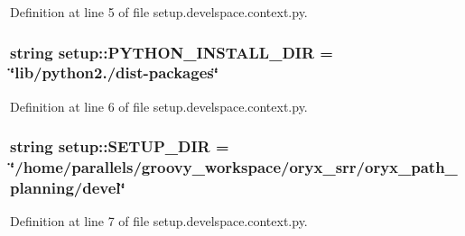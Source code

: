 \-Definition at line 5 of file setup.\-develspace.\-context.\-py.

\subsubsection[{\-P\-Y\-T\-H\-O\-N\-\_\-\-I\-N\-S\-T\-A\-L\-L\-\_\-\-D\-I\-R}]{\setlength{\rightskip}{0pt plus 5cm}string {\bf setup\-::\-P\-Y\-T\-H\-O\-N\-\_\-\-I\-N\-S\-T\-A\-L\-L\-\_\-\-D\-I\-R} = \char`\"{}lib/python2./dist-\/packages\char`\"{}}\label{namespacesetup_aeca0160af888aac6e3bd8a065852b61f}


\-Definition at line 6 of file setup.\-develspace.\-context.\-py.

\subsubsection[{\-S\-E\-T\-U\-P\-\_\-\-D\-I\-R}]{\setlength{\rightskip}{0pt plus 5cm}string {\bf setup\-::\-S\-E\-T\-U\-P\-\_\-\-D\-I\-R} = \char`\"{}/home/parallels/groovy\-\_\-workspace/oryx\-\_\-srr/oryx\-\_\-path\-\_\-planning/devel\char`\"{}}\label{namespacesetup_a98792229e61a663fcdf89c12b1f1dbc2}


\-Definition at line 7 of file setup.\-develspace.\-context.\-py.

